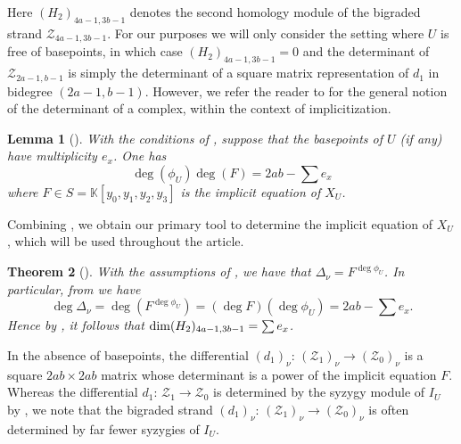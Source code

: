 \documentclass[reqno]{amsart}
\newtheorem{thm}{Theorem}[section]
\newtheorem{lemma}[thm]{Lemma}
\numberwithin{equation}{section}
\theoremstyle{definition}
\def\K{\mathbb{K}}
\def\Z{\mathcal{Z}}
\def\dim{\mathop{\rm dim}}
\begin{document}
Here $(H_2)_{4a-1,3b-1}$ denotes the second homology module of the bigraded strand $\Z_{4a-1,3b-1}$. For our purposes we will only consider the setting where $U$ is free of basepoints, in which case $(H_2)_{4a-1,3b-1}=0$ and the determinant of $\Z_{2a-1,b-1}$ is simply the determinant of a square matrix representation of $d_1$ in bidegree $(2a-1,b-1)$. However, we refer the reader to \cite{Chardin06} for the general notion of the determinant of a complex, within the context of implicitization.






\begin{lemma}[{\cite[7.4]{Botbol11}}]\label{Botbol degree lemma}
With the conditions of , suppose that the basepoints of $U$ (if any) have multiplicity $e_x$. One has
$$\deg (\phi_U)\deg(F) = 2ab -\sum e_x$$
where $F\in S=\K[y_0,y_1,y_2,y_3]$ is the implicit equation of $X_U$.
\end{lemma}



Combining , we obtain our primary tool to determine the implicit equation of $X_U$, which will be used throughout the article.



\begin{thm}[{\cite[7.5]{Botbol11}}]\label{Botbol implicit eqn}
    With the assumptions of , we have that $\Delta_\nu = F^{\deg \phi_U}$. In particular, from   we have
    $$\deg \Delta_\nu =\deg (F^{\deg \phi_U}) = (\deg F)(\deg \phi_U) =  2ab -\sum e_x.$$
    Hence by , it follows that $\dim (H_2)_{4a-1,3b-1} =\sum e_x$.
\end{thm}


In the absence of basepoints, the differential $(d_1)_\nu:\, (\Z_1)_\nu \rightarrow (\Z_0)_\nu$ is a square $2ab\times 2ab$ matrix whose determinant is a power of the implicit equation $F$. Whereas the differential $d_1:\,\Z_1\rightarrow \Z_0$ is determined by the syzygy module of $I_U$ by , we note that the bigraded strand $(d_1)_\nu:\, (\Z_1)_\nu \rightarrow (\Z_0)_\nu$ is often determined by far fewer syzygies of $I_U$.




\end{document}
